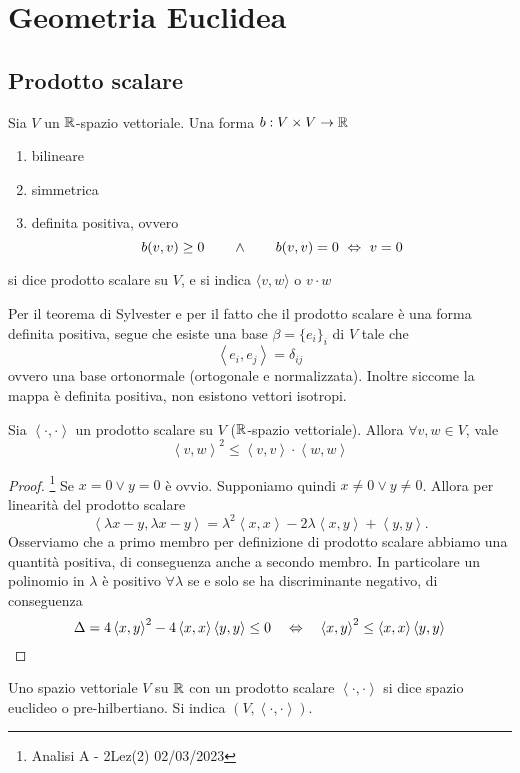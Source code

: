 \documentclass{article}     %
\newcommand{\scp}[1][\cdot,\cdot]{\left\langle #1 \right\rangle}
\begin{document}
\section{Geometria Euclidea}
\subsection{Prodotto scalare}
\begin{boxdef}
    Sia $V$ un $\mathbb{R}$-spazio vettoriale. Una forma $b:V\times V\to \mathbb{R}$ \begin{enumerate}[label=\it\roman*)]
        \item bilineare 
        \item simmetrica
        \item definita positiva, ovvero 
        \[b(v,v)\geq 0\qquad  \land\qquad b(v,v)=0\ \Leftrightarrow\ v=0\]
    \end{enumerate}
    si dice prodotto scalare su $V$, e si indica $\langle v,w \rangle$ o $v\cdot w$
\end{boxdef}
Per il teorema di Sylvester e per il fatto che il prodotto scalare è una forma definita positiva, segue che esiste una base $\beta=\{e_i\}_i$ di $V$ tale che
\[\scp[e_i,e_j]=\delta_{ij}\] 
ovvero una base ortonormale (ortogonale e normalizzata). Inoltre siccome la mappa è definita positiva, non esistono vettori isotropi.

\begin{lemma}
    Sia $\scp$ un prodotto scalare su $V$ ($\mathbb{R}$-spazio vettoriale). Allora $\forall v,w\in V$, vale \[\scp[v,w]^2\leq \scp[v,v]\cdot \scp[w,w]\]
\end{lemma}
\begin{proof}\footnote{Analisi A - 2Lez(2) 02/03/2023}
    Se $x=0\lor y=0$ è ovvio. Supponiamo quindi $x\neq 0\lor y\neq 0$. Allora per linearità del prodotto scalare
    \[\scp[\lambda x-y,\lambda x-y]=\lambda^2\scp[x,x]-2\lambda \scp[x,y]+\scp[y,y].\]
    Osserviamo che a primo membro per definizione di prodotto scalare abbiamo una quantità positiva, di conseguenza anche a secondo membro. In particolare un polinomio in $\lambda$ è positivo $\forall \lambda$ se e solo se ha discriminante negativo, di conseguenza
    \[\Delta=4\scp[x,y]^2-4\scp[x,x]\scp[y,y]\leq 0 \quad \Harr\quad \scp[x,y]^2\leq \scp[x,x]\scp[y,y]\]
\end{proof}

\begin{boxdef}
    Uno spazio vettoriale $V$ su $\mathbb{R}$ con un prodotto scalare $\scp$ si dice spazio euclideo o pre-hilbertiano. Si indica $(V,\scp)$.
\end{boxdef}
\end{document}
